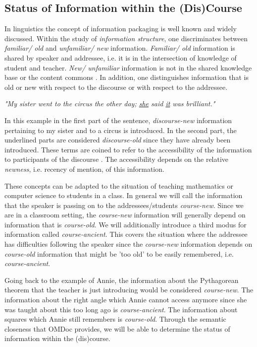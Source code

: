 \documentclass{llncs}
\begin{document}
\subsection{Status of Information within the (Dis)Course}
\label{sec:infostatus}
In linguistics the concept of information packaging \cite{CambridgeGrammar:npentrel14} is well known and widely discussed. Within the study of \textit{information structure}, one discriminates between \textit{familiar/ old} and \textit{unfamiliar/ new} information. \textit{Familiar/ old} information is shared by speaker and addressee, i.e. it is in the intersection of knowledge of student and teacher. \textit{New/ unfamiliar} information is not in the shared knowledge base or the content commons \cite{CNX:whitepaper}. In addition, one distinguishes information that is old or new with respect to the discourse or with respect to the addressee.

\begin{center}
\textit{"My sister went to the circus the other day; \underline{she} said \underline{it} was brilliant."}
\end{center}

In this example in the first part of the sentence, \textit{discourse-new} information pertaining to my sister and to a circus is introduced. In the second part, the underlined parts are considered \textit{discourse-old} since they have already been introduced. These terms are coined to refer to the accessibility of the information to participants of the discourse \cite{Newness:npentrel14}. The accessibility depends on the relative \textit{newness}, i.e. recency of mention, of this information.

These concepts can be adapted to the situation of teaching mathematics or computer science to students in a class. In general we will call the information that the speaker is passing on to the addressees/students \textit{course-new}. Since we are in a classroom setting, the \textit{course-new} information will generally depend on information that is \textit{course-old}. We will additionally introduce a third modus for information called \textit{course-ancient}. This covers the situation where the addressee has difficulties following the speaker since the \textit{course-new} information depends on \textit{course-old} information that might be 'too old' to be easily remembered, i.e. \textit{course-ancient}.

Going back to the example of Annie, the information about the Pythagorean theorem that the teacher is just introducing would be considered \textit{course-new}. The information about the right angle which Annie cannot access anymore since she was taught about this too long ago is \textit{course-ancient}. The information about squares which Annie still remembers is \textit{course-old}. Through the semantic closeness that OMDoc provides, we will be able to determine the status of information within the (dis)course.
\end{document}

